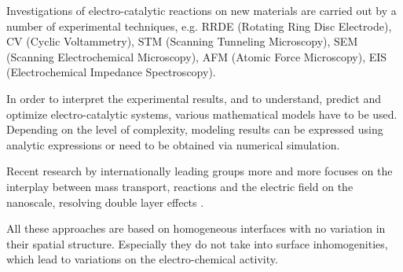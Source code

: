 \documentclass[a4paper,10pt]{article}
\begin{document}
Investigations of electro-catalytic reactions on new materials  
are carried out by a number of  experimental techniques,  e.g.
RRDE    (Rotating   Ring    Disc   Electrode),   
CV  (Cyclic  Voltammetry),  
STM (Scanning Tunneling Microscopy), 
SEM (Scanning  Electrochemical Microscopy),
AFM (Atomic Force Microscopy), 
EIS (Electrochemical Impedance Spectroscopy).

In order  to interpret  the experimental  results, and to understand,
predict and optimize electro-catalytic systems, various mathematical models
have to be used. Depending  on the  level of  complexity,
modeling  results  can  be  expressed using  analytic  expressions  or
need to be obtained via numerical simulation.


Recent research by  internationally leading groups  more and
more focuses  on the  interplay between  mass transport, reactions and the 
electric    field    on   the     nanoscale, resolving double layer effects \cite{lin2019understanding,tan2018double,eden2019modeling,bohra2019modeling}.
%

All these approaches are based on homogeneous interfaces with no variation in their
spatial  structure. Especially they  do   not  take  into surface inhomogenities, which lead to variations on the electro-chemical activity. 
\end{document}
